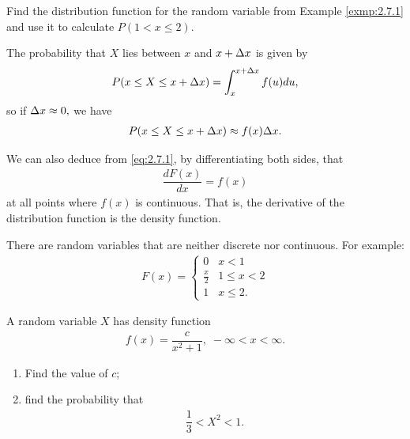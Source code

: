 	\begin{ejemplo}
	  \label{exmp:2.7.2}
	  Find the distribution function for the random variable from Example \ref{exmp:2.7.1} and use it to calculate $P(1 < x \leq 2).$
	\end{ejemplo}

	The probability that $X$ lies between $x$ and $x+\Delta x$ is given by
	\begin{align}
		\label{eq:2.7.4}
		P(x \leq X \leq x+\Delta x)= \int_{x}^{x+\Delta x}f(u)du,
	\end{align}
	so if $\Delta x \approx 0,$ we have
	\begin{align}
		\label{eq:2.7.5}
		P(x \leq X \leq x+\Delta x)\approx f(x) \Delta x.
	\end{align}

	We can also deduce from \eqref{eq:2.7.1}, by differentiating both sides, that
	\begin{align}
		\label{eq:2.7.6}
		\dfrac{dF(x)}{dx} = f(x)
	\end{align}
at all points where $f(x)$ is continuous. That is, the derivative of the distribution function is the density function.

	\begin{observacion}
		There are random variables that are neither discrete nor continuous. For example:
		\begin{align}
			F(x)=
			\begin{cases}
				0 & x <1 \\
				\frac{x}{2} & 1 \leq x < 2 \\
				1 & x \leq 2.
			\end{cases}
		\end{align}
	\end{observacion}

 \begin{ejemplo}
  \label{exmp:2.7.3} A random variable $X$ has density function
  \begin{align}
   f(x)=\dfrac{c}{x^{2}+1}, \; -\infty < x <\infty.
  \end{align}

  \begin{enumerate}
   \item Find the value of $c$; 
   \item find the probability that
   \begin{align}
    \dfrac{1}{3}< X^{2} <1.
   \end{align}
  \end{enumerate}
 \end{ejemplo}

